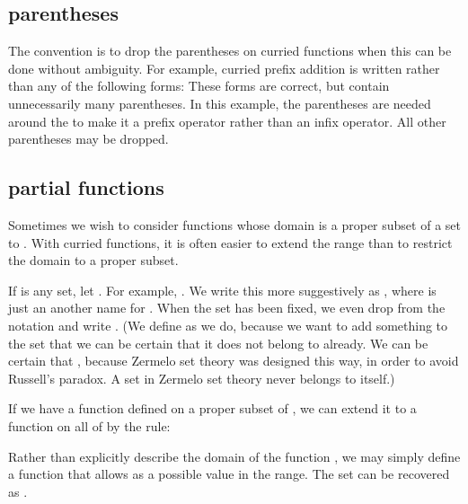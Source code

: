 \documentclass[cup9a]{cupbook}
\begin{document}
\subsection{parentheses}

The convention is to drop the parentheses on curried functions when this can be done without ambiguity.  For example, curried prefix addition is written
rather than any of the following forms:
These forms are correct, but contain unnecessarily many parentheses.
In this example, the parentheses are needed around the \mc{$(+)$} to make it
a prefix operator rather than an infix operator. All other parentheses may
be dropped.

\subsection{partial functions}

Sometimes we wish to consider functions whose domain is a proper subset of a set  to .  With curried functions, it is often easier to extend the range than to restrict the domain to a proper subset.

If  is any set, let .  For example,
.  We write this more suggestively
as , where  is just an
another name for .  When the set  has been fixed, we even drop
 from the notation and write .
(We define  as we do, because we want to add something to the set 
that we can be certain that it does not belong to  already.  We can
be certain that , because Zermelo set theory was designed this
way, in order to avoid Russell's paradox.  A set in Zermelo set theory
never belongs to itself.)

If we have a function  defined on a proper subset  of , we can
extend it to a function  on all of  by the rule:

Rather than explicitly describe the domain of the function , we may simply
define a function  that allows  as a possible value in the range.  The set  can be recovered as
.
\end{document}
